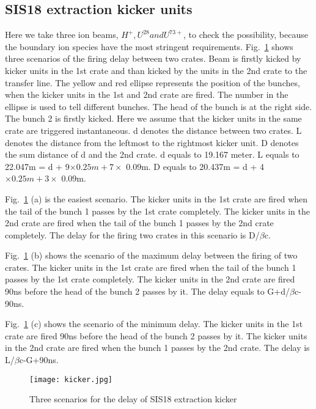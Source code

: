 \subsection{SIS18 extraction kicker units}
Here we take three ion beams, $H^+, U^{28} and U^{73+}$, to check the possibility, because the boundary ion species have the most stringent requirements. Fig.~\ref{kicker} shows three scenarios of the firing delay between two crates. Beam is firstly kicked by kicker units in the 1st crate and than kicked by the units in the 2nd crate to the transfer line. The yellow and red ellipse represents the position of the bunches, when the kicker units in the 1st and 2nd crate are fired. The number in the ellipse is used to tell different bunches. The head of the bunch is at the right side. The bunch 2 is firstly kicked. Here we assume that the kicker units in the same crate are triggered instantaneous. d denotes the distance between two crates. L denotes the distance from the leftmost to the rightmost kicker unit. D denotes the sum distance of d and the 2nd crate. d equals to 19.167 meter. L equals to 22.047m = d + 9$\times 0.25m + 7\times$ 0.09m. D equals to 20.437m = d + 4$\times 0.25m + 3\times$ 0.09m.

Fig.~\ref{kicker} (a) is the easiest scenario. The kicker units in the 1st crate are fired when the tail of the bunch 1 passes by the 1st crate completely. The kicker units in the 2nd crate are fired when the tail of the bunch 1 passes by the 2nd crate completely. The delay for the firing two crates in this scenario is D/$\beta$c. 

Fig.~\ref{kicker} (b) shows the scenario of the maximum delay between the firing of two crates. The kicker units in the 1st crate are fired when the tail of the bunch 1 passes by the 1st crate completely. The kicker units in the 2nd crate are fired 90ns before the head of the bunch 2 passes by it. The delay equals to G+d/$\beta$c-90ns.

Fig.~\ref{kicker} (c) shows the scenario of the minimum delay. The kicker units in the 1st crate are fired 90ns before the head of the bunch 2 passes by it. The kicker units in the 2nd crate are fired when the bunch 1 passes by the 2nd crate. The delay is L/$\beta$c-G+90ns.

\begin{figure}[!htb]
   \centering   
   \texttt{[image: kicker.jpg]}
   \caption{Three scenarios for the delay of SIS18 extraction kicker}
   \label{kicker}
\end{figure}

